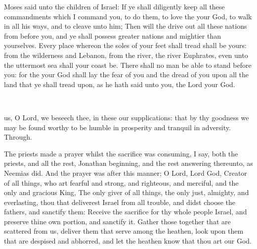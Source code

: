  Moses said unto the children of Israel: If ye shall diligently keep all these commandments which I command you, to do them, to love the  your God, to walk in all his ways, and to cleave unto him; Then will the  drive out all these nations from before you, and ye shall possess greater nations and mightier than yourselves. Every place whereon the soles of your feet shall tread shall be yours: from the wilderness and Lebanon, from the river, the river Euphrates, even unto the uttermost sea shall your coast be. There shall no man be able to stand before you: for the  your God shall lay the fear of you and the dread of you upon all the land that ye shall tread upon, as he hath said unto you, the Lord your God.

\\


\collect
{} us, O Lord, we beseech thee, in these our supplications: that by thy goodness we may be found worthy to be humble in prosperity and tranquil in adversity. Through.

 The priests made a prayer whilst the sacrifice was consuming, I say, both the priests, and all the rest, Jonathan beginning, and the rest answering thereunto, as Neemias did. And the prayer was after this manner; O Lord, Lord God, Creator of all things, who art fearful and strong, and righteous, and merciful, and the only and gracious King, The only giver of all things, the only just, almighty, and everlasting, thou that deliverest Israel from all trouble, and didst choose the fathers, and sanctify them: Receive the sacrifice for thy whole people Israel, and preserve thine own portion, and sanctify it. Gather those together that are scattered from us, deliver them that serve among the heathen, look upon them that are despised and abhorred, and let the heathen know that thou art our God.

\\

